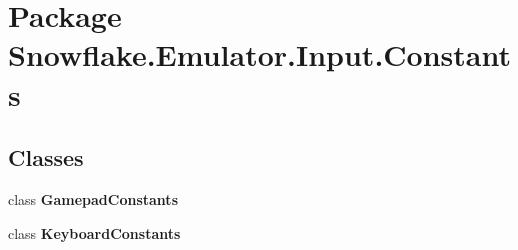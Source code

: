\hypertarget{namespace_snowflake_1_1_emulator_1_1_input_1_1_constants}{}\section{Package Snowflake.\+Emulator.\+Input.\+Constants}
\label{namespace_snowflake_1_1_emulator_1_1_input_1_1_constants}
\subsection*{Classes}
\begin{DoxyCompactItemize}
\item 
class {\bfseries Gamepad\+Constants}
\item 
class {\bfseries Keyboard\+Constants}
\end{DoxyCompactItemize}
